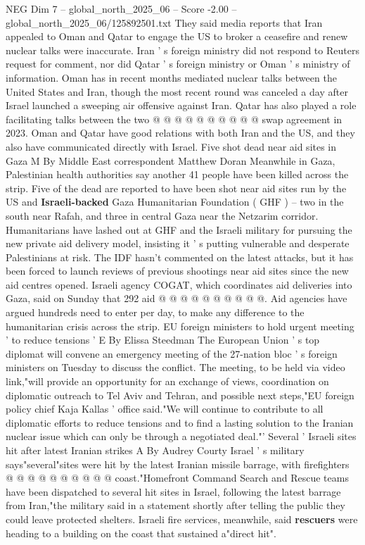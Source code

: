 \begin{textsample}{NEG Dim 7 – global\_north\_2025\_06 – Score -2.00 – global\_north\_2025\_06/125892501.txt}
They said media reports that Iran appealed to Oman and Qatar to engage the US to broker a ceasefire and renew nuclear talks were inaccurate.
Iran ' s foreign ministry did not respond to Reuters request for comment, nor did Qatar ' s foreign ministry or Oman ' s ministry of information.
Oman has in recent months mediated nuclear talks between the United States and Iran, though the most recent round was canceled a day after Israel launched a sweeping air offensive against Iran.
Qatar has also played a role facilitating talks between the two @ @ @ @ @ @ @ @ @ @ swap agreement in 2023.
Oman and Qatar have good relations with both Iran and the US, and they also have communicated directly with Israel.
Five shot dead near aid sites in Gaza M By Middle East correspondent Matthew Doran Meanwhile in Gaza, Palestinian health authorities say another 41 people have been killed across the strip.
Five of the dead are reported to have been shot near aid sites run by the US and \textbf{Israeli-backed} Gaza Humanitarian Foundation ( GHF ) -- two in the south near Rafah, and three in central Gaza near the Netzarim corridor.
Humanitarians have lashed out at GHF and the Israeli military for pursuing the new private aid delivery model, insisting it ' s putting vulnerable and desperate Palestinians at risk.
The IDF hasn't commented on the latest attacks, but it has been forced to launch reviews of previous shootings near aid sites since the new aid centres opened.
Israeli agency COGAT, which coordinates aid deliveries into Gaza, said on Sunday that 292 aid @ @ @ @ @ @ @ @ @ @.
Aid agencies have argued hundreds need to enter per day, to make any difference to the humanitarian crisis across the strip.
EU foreign ministers to hold urgent meeting ' to reduce tensions ' E By Elissa Steedman The European Union ' s top diplomat will convene an emergency meeting of the 27-nation bloc ' s foreign ministers on Tuesday to discuss the conflict.
The meeting, to be held via video link,"will provide an opportunity for an exchange of views, coordination on diplomatic outreach to Tel Aviv and Tehran, and possible next steps,"EU foreign policy chief Kaja Kallas ' office said."We will continue to contribute to all diplomatic efforts to reduce tensions and to find a lasting solution to the Iranian nuclear issue which can only be through a negotiated deal."' Several ' Israeli sites hit after latest Iranian strikes A By Audrey Courty Israel ' s military says"several"sites were hit by the latest Iranian missile barrage, with firefighters @ @ @ @ @ @ @ @ @ @ coast."Homefront Command Search and Rescue teams have been dispatched to several hit sites in Israel, following the latest barrage from Iran,"the military said in a statement shortly after telling the public they could leave protected shelters.
Israeli fire services, meanwhile, said \textbf{rescuers} were heading to a building on the coast that sustained a"direct hit".

\end{textsample}
